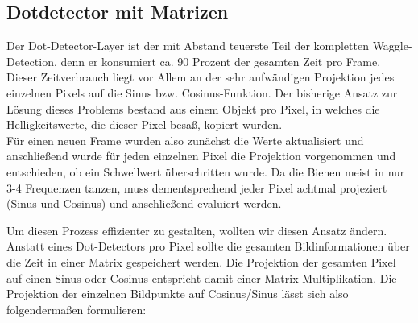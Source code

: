 \documentclass[11pt,a4paper]{article}
\begin{document}
\subsection{Dotdetector mit Matrizen}%

Der Dot-Detector-Layer ist der mit Abstand teuerste Teil der kompletten Waggle-Detection, denn er konsumiert ca. 90 Prozent der gesamten Zeit pro Frame.
Dieser Zeitverbrauch liegt vor Allem an der sehr aufwändigen Projektion jedes einzelnen Pixels auf die Sinus bzw. Cosinus-Funktion.
Der bisherige Ansatz zur Lösung dieses Problems bestand aus einem Objekt pro Pixel, in welches die Helligkeitswerte, die dieser Pixel besaß, kopiert wurden.\\
Für einen neuen Frame wurden also zunächst die Werte aktualisiert und anschließend wurde für jeden einzelnen Pixel die Projektion vorgenommen und entschieden, ob ein Schwellwert überschritten wurde.
Da die Bienen meist in nur 3-4 Frequenzen tanzen, muss dementsprechend jeder Pixel achtmal projeziert (Sinus und Cosinus) und anschließend evaluiert werden.

Um diesen Prozess effizienter zu gestalten, wollten wir diesen Ansatz ändern. Anstatt eines Dot-Detectors pro Pixel sollte die gesamten Bildinformationen über die Zeit in einer Matrix gespeichert werden.
Die Projektion der gesamten Pixel auf einen Sinus oder Cosinus entspricht damit einer Matrix-Multiplikation.
Die Projektion der einzelnen Bildpunkte auf Cosinus/Sinus lässt sich also folgendermaßen formulieren:
\end{document}
